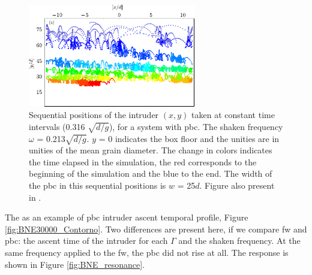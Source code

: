 \begin{figure}
    \centering
    \includegraphics[width=0.65\textwidth]{04-figuras/BNE_PositionPBC.pdf}
    \caption[BNE with periodic boundary: sample of intruder positions.]{Sequential positions of the intruder $(x, y)$ taken at constant time intervals (0.316 $\sqrt{d/g}$), for a system with pbc. The shaken frequency $\omega$ = 0.213$\sqrt{d/g}$. $y$ = 0 indicates the box floor and the unities are in unities of the mean grain diameter. The change in colors indicates the time elapsed in the simulation, the red corresponds to the beginning of the simulation and the blue to the end. The width of the pbc in this sequential positions is $w$ = 25$d$. Figure also present in \cite{Large-deviation_quantification_of_boundary_conditions_on_the_Brazil_nut_effect}.}
    \label{fig:BNE_intruderpbc}
\end{figure}


    The as an example of pbc intruder ascent temporal profile, Figure \ref{fig:BNE30000_Contorno}. Two differences are present here, if we compare fw and pbc: the ascent time of the intruder for each $\Gamma$ and the shaken frequency. At the same frequency applied to the fw, the pbc did not rise at all. The response is shown in Figure \ref{fig:BNE_resonance}.


